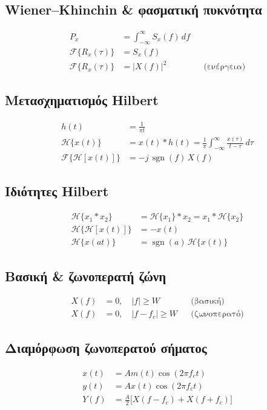 \documentclass[11pt,a4paper]{article}
\newcommand{\F}{\mathcal{F}}
\newcommand{\sgn}{\operatorname{sgn}}
\newcommand{\Hilbert}{\mathcal{H}}
\begin{document}
\subsection{Wiener--Khinchin \& φασματική πυκνότητα}
\begin{align}
P_x &= \int_{-\infty}^{\infty} S_x(f)\,df \\
\F\{R_x(\tau)\} &= S_x(f) \\
\F\{R_x(\tau)\} &= |X(f)|^2 && \text{(ενέργεια)}
\end{align}

\subsection{Μετασχηματισμός Hilbert}
\begin{align}
h(t) &= \frac{1}{\pi t} \\
\Hilbert\{x(t)\} &= x(t) \ast h(t) = \frac{1}{\pi}\int_{-\infty}^{\infty} \frac{x(\tau)}{t-\tau}\,d\tau \\
\F\{\Hilbert[x(t)]\} &= -j\,\sgn(f)\,X(f)
\end{align}

\subsection{Ιδιότητες Hilbert}
\begin{align}
\Hilbert\{x_1 \ast x_2\} &= \Hilbert\{x_1\} \ast x_2 = x_1 \ast \Hilbert\{x_2\} \\
\Hilbert\{\Hilbert[x(t)]\} &= -x(t) \\
\Hilbert\{x(at)\} &= \sgn(a)\,\Hilbert\{x(t)\}
\end{align}

\subsection{Βασική \& ζωνοπερατή ζώνη}
\begin{align}
X(f) &= 0, \quad |f| \ge W && \text{(βασική)} \\
X(f) &= 0, \quad |f - f_c| \ge W && \text{(ζωνοπερατό)}
\end{align}

\subsection{Διαμόρφωση ζωνοπερατού σήματος}
\begin{align}
x(t) &= A m(t)\cos(2\pi f_c t) \\
y(t) &= A x(t)\cos(2\pi f_c t) \\
Y(f) &= \frac{A}{2}\bigl[X(f-f_c) + X(f+f_c)\bigr]
\end{align}
\end{document}
